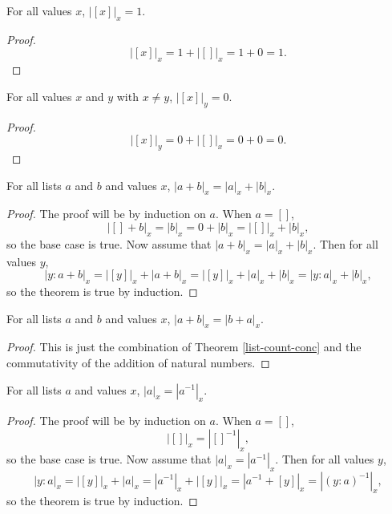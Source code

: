 \documentclass[../math.tex]{subfiles}
\begin{document}
\begin{theorem}
    For all values $x$, $|[x]|_x = 1$.
\end{theorem}
\begin{proof}
    \[
        |[x]|_x = 1 + |[]|_x = 1 + 0 = 1.
    \]
\end{proof}

\begin{theorem}
    For all values $x$ and $y$ with $x \neq y$, $|[x]|_y = 0$.
\end{theorem}
\begin{proof}
    \[
        |[x]|_y = 0 + |[]|_x = 0 + 0 = 0.
    \]
\end{proof}

\begin{theorem} \label{list-count-conc}
    For all lists $a$ and $b$ and values $x$, $|a + b|_x = |a|_x + |b|_x$.
\end{theorem}
\begin{proof}
    The proof will be by induction on $a$.  When $a = []$,
    \[
        |[] + b|_x = |b|_x = 0 + |b|_x = |[]|_x + |b|_x,
    \]
    so the base case is true.  Now assume that $|a + b|_x = |a|_x + |b|_x$.
    Then for all values $y$,
    \[
        |y : a + b|_x = |[y]|_x + |a + b|_x = |[y]|_x + |a|_x + |b|_x
        = |y : a|_x + |b|_x,
    \]
    so the theorem is true by induction.
\end{proof}

\begin{theorem} \label{list-count-comm}
    For all lists $a$ and $b$ and values $x$, $|a + b|_x = |b + a|_x$.
\end{theorem}
\begin{proof}
    This is just the combination of Theorem \ref{list-count-conc} and the
    commutativity of the addition of natural numbers.
\end{proof}

\begin{theorem} \label{list-count-reverse}
    For all lists $a$ and values $x$, $|a|_x = |a^{-1}|_x$.
\end{theorem}
\begin{proof}
    The proof will be by induction on $a$.  When $a = []$,
    \[
        |[]|_x = |[]^{-1}|_x,
    \]
    so the base case is true.  Now assume that $|a|_x = |a^{-1}|_x$.  Then for
    all values $y$,
    \[
        |y : a|_x = |[y]|_x + |a|_x = |a^{-1}|_x + |[y]|_x = |a^{-1} + [y]|_x
        = |(y : a)^{-1}|_x,
    \]
    so the theorem is true by induction.
\end{proof}
\end{document}
